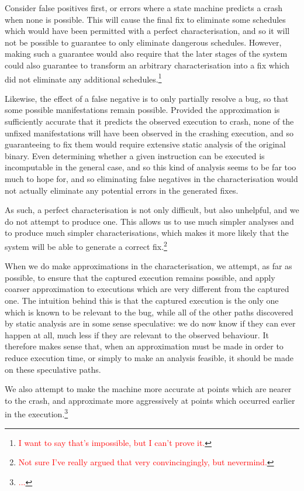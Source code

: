 \documentclass[10pt,twocolumn,preprint,natbib,authoryear]{sigplanconf}
\newcommand{\editorial}[1]{\textcolor{red}{\footnote{\textcolor{red}{#1}}}}
\begin{document}
Consider false positives first, or errors where a state machine
predicts a crash when none is possible.  This will cause the final fix
to eliminate some schedules which would have been permitted with a
perfect characterisation, and so it will not be possible to guarantee
to only eliminate dangerous schedules.  However, making such a
guarantee would also require that the later stages of the system could
also guarantee to transform an arbitrary characterisation into a fix
which did not eliminate any additional schedules.\editorial{I want to
  say that's impossible, but I can't prove it.}

Likewise, the effect of a false negative is to only partially resolve
a bug, so that some possible manifestations remain possible.  Provided
the approximation is sufficiently accurate that it predicts the
observed execution to crash, none of the unfixed manifestations will
have been observed in the crashing execution, and so guaranteeing to
fix them would require extensive static analysis of the original
binary.  Even determining whether a given instruction can be executed
is incomputable in the general case, and so this kind of analysis
seems to be far too much to hope for, and so eliminating false
negatives in the characterisation would not actually eliminate any
potential errors in the generated fixes.

As such, a perfect characterisation is not only difficult, but also
unhelpful, and we do not attempt to produce one.  This allows us to
use much simpler analyses and to produce much simpler
characterisations, which makes it more likely that the system will be
able to generate a correct fix.\editorial{Not sure I've really argued
  that very convincingingly, but nevermind.}

When we do make approximations in the characterisation, we attempt, as
far as possible, to ensure that the captured execution remains
possible, and apply coarser approximation to executions which are very
different from the captured one.  The intuition behind this is that
the captured execution is the only one which is known to be relevant
to the bug, while all of the other paths discovered by static analysis
are in some sense speculative: we do now know if they can ever happen
at all, much less if they are relevant to the observed behaviour.  It
therefore makes sense that, when an approximation must be made in
order to reduce execution time, or simply to make an analysis
feasible, it should be made on these speculative paths.

We also attempt to make the machine more accurate at points which are
nearer to the crash, and approximate more aggressively at points which
occurred earlier in the execution.\editorial{...}
\end{document}
